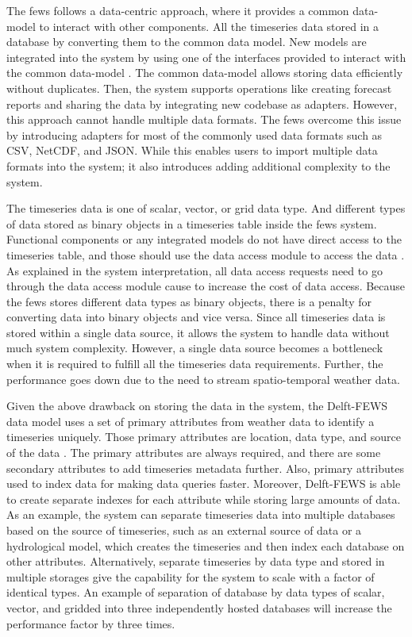 The \acrshort{fews} follows a data-centric approach, where it provides a common data-model to interact with other components. All the timeseries data stored in a database by converting them to the common data model. New models are integrated into the system by using one of the interfaces provided to interact with the common data-model \cite{Werner2013TheSystem}. The common data-model allows storing data efficiently without duplicates. Then, the system supports operations like creating forecast reports and sharing the data by integrating new codebase as adapters. However, this approach cannot handle multiple data formats. The \acrshort{fews} overcome this issue by introducing adapters for most of the commonly used data formats such as CSV, NetCDF, and JSON. While this enables users to import multiple data formats into the system; it also introduces adding additional complexity to the system.

The timeseries data is one of scalar, vector, or grid data type. And different types of data stored as binary objects in a timeseries table inside the \acrshort{fews} system. Functional components or any integrated models do not have direct access to the timeseries table, and those should use the data access module to access the data \cite{Werner2013TheSystem}. As explained in the system interpretation, all data access requests need to go through the data access module cause to increase the cost of data access. Because the \acrshort{fews} stores different data types as binary objects, there is a penalty for converting data into binary objects and vice versa. Since all timeseries data is stored within a single data source, it allows the system to handle data without much system complexity. However, a single data source becomes a bottleneck when it is required to fulfill all the timeseries data requirements. Further, the performance goes down due to the need to stream spatio-temporal weather data.

Given the above drawback on storing the data in the system, the Delft-FEWS data model uses a set of primary attributes from weather data to identify a timeseries uniquely. Those primary attributes are location, data type, and source of the data \cite{Werner2013TheSystem}. The primary attributes are always required, and there are some secondary attributes to add timeseries metadata further. Also, primary attributes used to index data for making data queries faster. Moreover, Delft-FEWS is able to create separate indexes for each attribute while storing large amounts of data. As an example, the system can separate timeseries data into multiple databases based on the source of timeseries, such as an external source of data or a hydrological model, which creates the timeseries and then index each database on other attributes. Alternatively, separate timeseries by data type and stored in multiple storages give the capability for the system to scale with a factor of identical types. An example of separation of database by data types of scalar, vector, and gridded into three independently hosted databases will increase the performance factor by three times.

